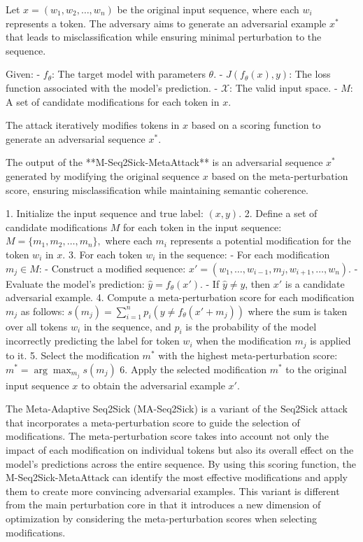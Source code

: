Let $x = (w_1, w_2, \dots, w_n)$ be the original input sequence, where each $w_i$ represents a token. The adversary aims to generate an adversarial example $x^*$ that leads to misclassification while ensuring minimal perturbation to the sequence.

Given:
- $f_{\theta}$: The target model with parameters $\theta$.
- $J(f_{\theta}(x), y)$: The loss function associated with the model’s prediction.
- $\mathcal{X}$: The valid input space.
- $M$: A set of candidate modifications for each token in $x$.

The attack iteratively modifies tokens in $x$ based on a scoring function to generate an adversarial sequence $x^*$.

The output of the **M-Seq2Sick-MetaAttack** is an adversarial sequence $x^*$ generated by modifying the original sequence $x$ based on the meta-perturbation score, ensuring misclassification while maintaining semantic coherence.


1. Initialize the input sequence and true label:
   $
   (x, y).
   $
2. Define a set of candidate modifications $M$ for each token in the input sequence:
   $
   M = \{m_1, m_2, \ldots, m_n\},
   $
   where each $m_i$ represents a potential modification for the token $w_i$ in $x$.
3. For each token $w_i$ in the sequence:
   - For each modification $m_j \in M$:
     - Construct a modified sequence:
     $
     x' = (w_1, \ldots, w_{i-1}, m_j, w_{i+1}, \ldots, w_n).
     $
     - Evaluate the model's prediction:
     $
     \hat{y} = f_{\theta}(x').
     $
     - If $\hat{y} \neq y$, then $x'$ is a candidate adversarial example.
4. Compute a meta-perturbation score for each modification $m_j$ as follows:
   $
   s(m_j) = \sum_{i=1}^n p_i(y \neq f_\theta(x' + m_j))
   $
   where the sum is taken over all tokens $w_i$ in the sequence, and $p_i$ is the probability of the model incorrectly predicting the label for token $w_i$ when the modification $m_j$ is applied to it.
5. Select the modification $m^*$ with the highest meta-perturbation score:
   $
   m^* = \arg\max_{m_j} s(m_j)
   $
6. Apply the selected modification $m^*$ to the original input sequence $x$ to obtain the adversarial example $x'$.

The Meta-Adaptive Seq2Sick (MA-Seq2Sick) is a variant of the Seq2Sick attack that incorporates a meta-perturbation score to guide the selection of modifications. The meta-perturbation score takes into account not only the impact of each modification on individual tokens but also its overall effect on the model's predictions across the entire sequence. By using this scoring function, the M-Seq2Sick-MetaAttack can identify the most effective modifications and apply them to create more convincing adversarial examples. This variant is different from the main perturbation core in that it introduces a new dimension of optimization by considering the meta-perturbation scores when selecting modifications.